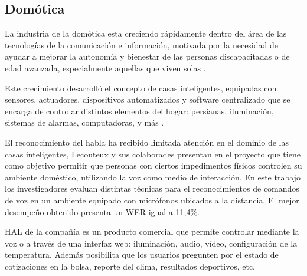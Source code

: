 \subsection{Dom\'otica}
\label{sec:domotica}

La industria de la dom\'otica esta creciendo r\'apidamente dentro del \'area de las tecnolog\'ias de la
comunicaci\'on e informaci\'on, motivada por la necesidad de ayudar a mejorar la autonom\'ia y bienestar de las personas
discapacitadas o de edad avanzada, especialmente aquellas que viven solas \cite{AlshuVoice2011}.

Este crecimiento desarroll\'o el concepto de casas inteligentes, equipadas con sensores, actuadores, dispositivos
automatizados y software centralizado que se encarga de controlar distintos elementos del hogar: persianas, iluminaci\'on,
sistemas de alarmas, computadoras, y m\'as \cite{LecouteuxSpeech2011, UshaWireless2012}.

El reconocimiento del habla ha recibido limitada atenci\'on en el dominio de las casas inteligentes, Lecouteux y
sus colaborades presentan en \cite{LecouteuxSpeech2011} el proyecto  que tiene como objetivo
permitir que personas con ciertos impedimentos f\'isicos controlen su ambiente dom\'estico, utilizando la voz
como medio de interacci\'on. En este trabajo los investigadores evaluan distintas t\'ecnicas para el reconocimientos
de comandos de voz en un ambiente equipado con micr\'ofonos ubicados a la distancia. El mejor desempe\~no obtenido
presenta un WER igual a 11,4\%.

HAL \cite{HAL} de la compa\~n\'ia  es un producto comercial que permite controlar mediante
la voz o a trav\'es de una interfaz web: iluminaci\'on, audio, v\'ideo, configuraci\'on de la temperatura. Adem\'as
posibilita que los usuarios pregunten por el estado de cotizaciones en la bolsa, reporte del clima, resultados deportivos, etc.
